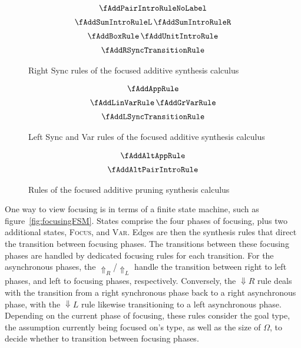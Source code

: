 \begin{figure}[H]
  \begin{align*}
\begin{array}{c}
  \fAddPairIntroRuleNoLabel
  \\[0.5em]
  \fAddSumIntroRuleL
  \,
  \fAddSumIntroRuleR
  \\[0.5em]
  \fAddBoxRule
  \,
  \fAddUnitIntroRule
  \\[0.5em]
  \fAddRSyncTransitionRule
  \end{array}
  \end{align*}
  \caption{Right Sync rules of the focused additive synthesis calculus}
  \label{fig:focus-add-right-sync}
\end{figure}

\begin{figure}[H]
  \begin{align*}
\begin{array}{c}
  \fAddAppRule
  \\[0.5em]
  \fAddLinVarRule
  \,
  \fAddGrVarRule
  \\[0.5em]
  \fAddLSyncTransitionRule
  \end{array}
  \end{align*}
  \caption{Left Sync and Var rules of the focused additive synthesis calculus}
  \label{fig:focus-add-left-sync}
\end{figure}

\begin{figure}[H]
  \begin{align*}
\begin{array}{c}
\fAddAltAppRule
  \\[0.5em]
\fAddAltPairIntroRule
  \end{array}
  \end{align*}
  \caption{Rules of the focused additive pruning synthesis calculus}
  \label{fig:focus-add-pruning}
\end{figure}

One way to view focusing is in terms of a finite state machine, such as
figure~\ref{fig:focusingFSM}. States comprise the four phases of focusing, plus
two additional states, \textsc{Focus}, and \textsc{Var}. Edges are then the
synthesis rules that direct the transition between focusing phases. The
transitions between these focusing phases are handled by dedicated focusing
rules for each transition. For the asynchronous phases, the
$\Uparrow_{R}$/$\Uparrow_{L}$ handle the transition between right to left
phases, and left to focusing phases, respectively. Conversely, the
$\Downarrow{R}$ rule deals with the transition from a right synchronous phase
back to a right asynchronous phase, with the $\Downarrow{L}$ rule likewise
transitioning to a left asynchronous phase. Depending on the current phase of
focusing, these rules consider the goal type, the assumption currently being
focused on's type, as well as the size of $\Omega$, to decide whether to
transition between focusing phases. 

